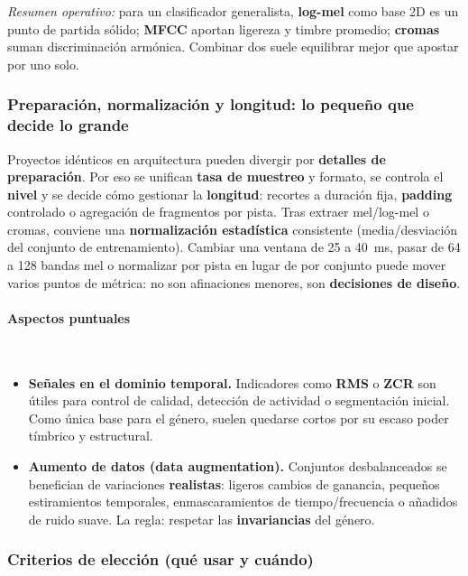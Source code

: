 \documentclass[12pt,twoside]{article}
\begin{document}
\medskip
\noindent\textit{Resumen operativo:} para un clasificador generalista, \textbf{log-mel} como base 2D es un punto de partida sólido; \textbf{MFCC} aportan ligereza y timbre promedio; \textbf{cromas} suman discriminación armónica. Combinar dos suele equilibrar mejor que apostar por uno solo.

\subsubsection{Preparación, normalización y longitud: lo pequeño que decide lo grande}

Proyectos idénticos en arquitectura pueden divergir por \textbf{detalles de preparación}. Por eso se unifican \textbf{tasa de muestreo} y formato, se controla el \textbf{nivel} y se decide cómo gestionar la \textbf{longitud}: recortes a duración fija, \textbf{padding} controlado o agregación de fragmentos por pista. Tras extraer mel/log-mel o cromas, conviene una \textbf{normalización estadística} consistente (media/desviación del conjunto de entrenamiento). Cambiar una ventana de 25 a 40~ms, pasar de 64 a 128 bandas mel o normalizar por pista en lugar de por conjunto puede mover varios puntos de métrica: no son afinaciones menores, son \textbf{decisiones de diseño}.

\paragraph{Aspectos puntuales} \mbox{}\\[-0.8em]
\begin{itemize}
  \item \textbf{Señales en el dominio temporal.} Indicadores como \textbf{RMS} o \textbf{ZCR} son útiles para control de calidad, detección de actividad o segmentación inicial. Como única base para el género, suelen quedarse cortos por su escaso poder tímbrico y estructural.
  \item \textbf{Aumento de datos (data augmentation).} Conjuntos desbalanceados se benefician de variaciones \textbf{realistas}: ligeros cambios de ganancia, pequeños estiramientos temporales, enmascaramientos de tiempo/frecuencia o añadidos de ruido suave. La regla: respetar las \textbf{invariancias} del género.
\end{itemize}

\subsubsection{Criterios de elección (qué usar y cuándo)}
\end{document}
